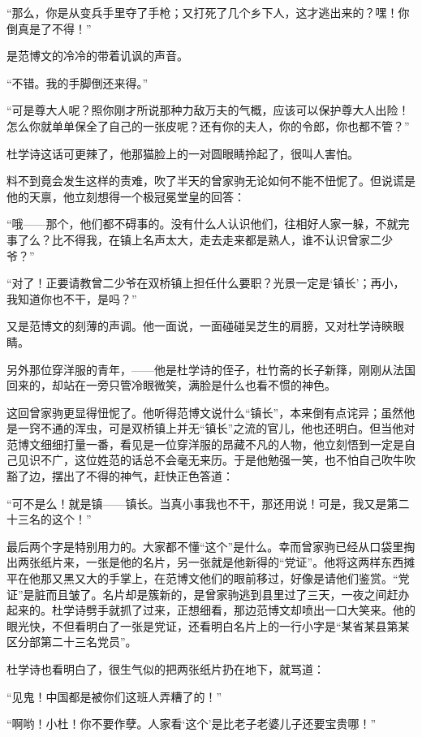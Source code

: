 \par “那么，你是从变兵手里夺了手枪；又打死了几个乡下人，这才逃出来的？嘿！你倒真是了不得！”
\par 是范博文的冷冷的带着讥讽的声音。
\par “不错。我的手脚倒还来得。”
\par “可是尊大人呢？照你刚才所说那种力敌万夫的气概，应该可以保护尊大人出险！怎么你就单单保全了自己的一张皮呢？还有你的夫人，你的令郎，你也都不管？”
\par 杜学诗这话可更辣了，他那猫脸上的一对圆眼睛拎起了，很叫人害怕。
\par 料不到竟会发生这样的责难，吹了半天的曾家驹无论如何不能不忸怩了。但说谎是他的天禀，他立刻想得一个极冠冕堂皇的回答：
\par “哦——那个，他们都不碍事的。没有什么人认识他们，往相好人家一躲，不就完事了么？比不得我，在镇上名声太大，走去走来都是熟人，谁不认识曾家二少爷？”
\par “对了！正要请教曾二少爷在双桥镇上担任什么要职？光景一定是‘镇长’；再小，我知道你也不干，是吗？”
\par 又是范博文的刻薄的声调。他一面说，一面碰碰吴芝生的肩膀，又对杜学诗鿃眼睛。
\par 另外那位穿洋服的青年，——他是杜学诗的侄子，杜竹斋的长子新箨，刚刚从法国回来的，却站在一旁只管冷眼微笑，满脸是什么也看不惯的神色。
\par 这回曾家驹更显得忸怩了。他听得范博文说什么“镇长”，本来倒有点诧异；虽然他是一窍不通的浑虫，可是双桥镇上并无“镇长”之流的官儿，他也还明白。但当他对范博文细细打量一番，看见是一位穿洋服的昂藏不凡的人物，他立刻悟到一定是自己见识不广，这位姓范的话总不会毫无来历。于是他勉强一笑，也不怕自己吹牛吹豁了边，摆出了不得的神气，赶快正色答道：
\par “可不是么！就是镇——镇长。当真小事我也不干，那还用说！可是，我又是第二十三名的这个！”
\par 最后两个字是特别用力的。大家都不懂“这个”是什么。幸而曾家驹已经从口袋里掏出两张纸片来，一张是他的名片，另一张就是他新得的“党证”。他将这两样东西摊平在他那又黑又大的手掌上，在范博文他们的眼前移过，好像是请他们鉴赏。“党证”是脏而且皱了。名片却是簇新的，是曾家驹逃到县里过了三天，一夜之间赶办起来的。杜学诗劈手就抓了过来，正想细看，那边范博文却喷出一口大笑来。他的眼光快，不但看明白了一张是党证，还看明白名片上的一行小字是“某省某县第某区分部第二十三名党员”。
\par 杜学诗也看明白了，很生气似的把两张纸片扔在地下，就骂道：
\par “见鬼！中国都是被你们这班人弄糟了的！”
\par “啊哟！小杜！你不要作孽。人家看‘这个’是比老子老婆儿子还要宝贵哪！”
